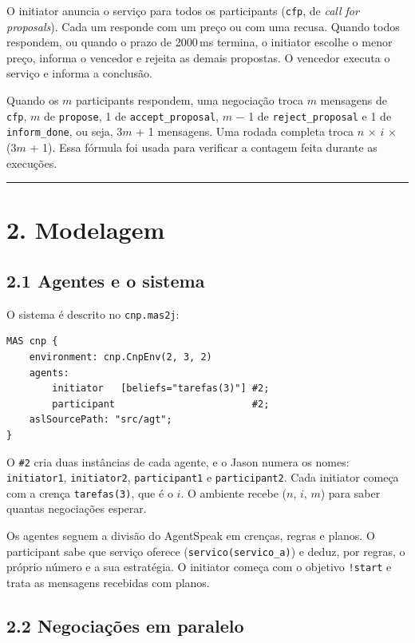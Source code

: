 \documentclass[11pt,a4paper]{article}
\newcommand{\cod}[1]{\texttt{#1}}
\newcommand{\separador}{\begin{center}\rule{0.45\linewidth}{0.4pt}\end{center}}
\begin{document}
O initiator anuncia o serviço para todos os participants (\cod{cfp}, de \emph{call for proposals}). Cada um responde com um preço ou com uma recusa. Quando todos respondem, ou quando o prazo de 2000\,ms termina, o initiator escolhe o menor preço, informa o vencedor e rejeita as demais propostas. O vencedor executa o serviço e informa a conclusão.

Quando os $m$ participants respondem, uma negociação troca $m$ mensagens de \cod{cfp}, $m$ de \cod{propose}, 1 de \cod{accept\_proposal}, $m$ $-$ 1 de \cod{reject\_proposal} e 1 de \cod{inform\_done}, ou seja, 3$m$ + 1 mensagens. Uma rodada completa troca $n$ $\times$ $i$ $\times$ (3$m$ + 1). Essa fórmula foi usada para verificar a contagem feita durante as execuções.

\separador

\section*{2. Modelagem}

\subsection*{2.1 Agentes e o sistema}

O sistema é descrito no \cod{cnp.mas2j}:

\begin{lstlisting}
MAS cnp {
    environment: cnp.CnpEnv(2, 3, 2)
    agents:
        initiator   [beliefs="tarefas(3)"] #2;
        participant                        #2;
    aslSourcePath: "src/agt";
}
\end{lstlisting}

O \cod{\#2} cria duas instâncias de cada agente, e o Jason numera os nomes: \cod{initiator1}, \cod{initiator2}, \cod{participant1} e \cod{participant2}. Cada initiator começa com a crença \cod{tarefas(3)}, que é o $i$. O ambiente recebe ($n$, $i$, $m$) para saber quantas negociações esperar.

Os agentes seguem a divisão do AgentSpeak em crenças, regras e planos. O participant sabe que serviço oferece (\cod{servico(servico\_a)}) e deduz, por regras, o próprio número e a sua estratégia. O initiator começa com o objetivo \cod{!start} e trata as mensagens recebidas com planos.

\subsection*{2.2 Negociações em paralelo}
\end{document}
